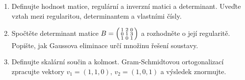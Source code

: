 \begin{zadani}
\begin{enumerate}[label=(\alph*)]
  \item {} Definujte hodnost matice, regulární a inverzní matici a determinant. Uveďte vztah mezi regularitou, determinantem a vlastními čísly.
  \item {} Spočtěte determinant matice $B=\begin{psmallmatrix}1&2&0\\0&1&3\\1&0&1\end{psmallmatrix}$ a rozhodněte o její regularitě. Popište, jak Gaussova eliminace určí množinu řešení soustavy.
  \item {} Definujte skalární součin a kolmost. Gram-Schmidtovou ortogonalizací zpracujte vektory $v_1=(1,1,0)$, $v_2=(1,0,1)$ a výsledek znormujte.
\end{enumerate}
\end{zadani}

